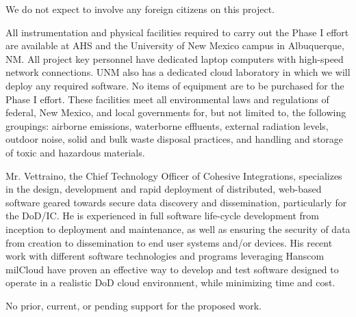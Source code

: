 \documentclass{sbir}
\begin{document}
{{{
We do not expect to involve any foreign citizens on this project.

 {}
All instrumentation and physical facilities required to carry out the Phase I effort are available at AHS and the University of New Mexico campus in Albuquerque, NM. All project key personnel have dedicated laptop computers with high-speed network connections.  UNM also has a dedicated cloud laboratory in which we will deploy any required software.  No items of equipment are to be purchased for the Phase I effort. These facilities meet all environmental laws and regulations of federal, New Mexico, and local governments for, but not limited to, the following groupings: airborne emissions, waterborne effluents, external radiation levels, outdoor noise, solid and bulk waste disposal practices, and handling and storage of toxic and hazardous materials.

\label{subs}
Mr. Vettraino, the Chief Technology Officer of Cohesive Integrations, specializes in the design, development and rapid deployment of distributed, web-based software geared towards secure data discovery and dissemination, particularly for the DoD/IC. He is experienced in full software life-cycle development from inception to deployment and maintenance, as well as ensuring the security of data from creation to dissemination to end user systems and/or devices. His recent work with different software technologies and programs leveraging Hanscom milCloud have proven an effective way to develop and test software designed to operate in a realistic DoD cloud environment, while minimizing time and cost.

\vspace{-12pt}

No prior, current, or pending support for the proposed work.

\printbibliography

\clearpage

%

}}}
\end{document}
